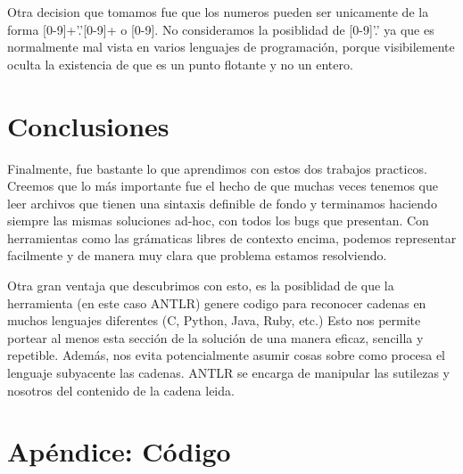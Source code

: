 \documentclass[a4paper]{article}
\begin{document}
Otra decision que tomamos fue que los numeros pueden ser unicamente de la forma
[0-9]+'.'[0-9]+ o [0-9]. No consideramos  la posiblidad de [0-9]'.' ya que es
normalmente mal vista en varios lenguajes de programaci\'on, porque visibilemente
oculta la existencia de que es un punto flotante y no un entero.


\section{Conclusiones}
Finalmente, fue bastante lo que aprendimos con estos dos trabajos practicos.
Creemos que lo m\'as importante fue el hecho de que muchas veces tenemos que
leer archivos que tienen una sintaxis definible de fondo y terminamos haciendo
siempre las mismas soluciones ad-hoc, con todos los bugs que presentan. Con
herramientas como las gr\'amaticas libres de contexto encima, podemos representar
facilmente y de manera muy clara que problema estamos resolviendo.

Otra gran ventaja que descubrimos con esto, es la posiblidad de que la herramienta
(en este caso ANTLR) genere codigo para reconocer cadenas en muchos lenguajes
diferentes (C, Python, Java, Ruby, etc.) Esto nos permite portear al menos 
esta secci\'on de la soluci\'on de una manera eficaz, sencilla y repetible. 
Adem\'as, nos evita potencialmente asumir cosas sobre como procesa el lenguaje
subyacente las cadenas. ANTLR se encarga de manipular las sutilezas y nosotros
del contenido de la cadena leida.


\section{Ap\'endice: C\'odigo}
\end{document}
